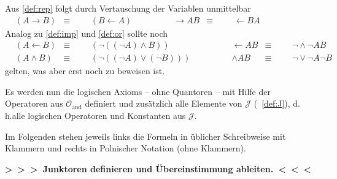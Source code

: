 \documentclass[english,ngerman,parskip=half,headsepline,footsepline,
	fleqn,notitlepage]{scrreprt}
\makeatletter
\newcommand*{\lrep}{\leftarrow}%
\newcommand*{\limp}{\rightarrow}%
\newcommand*{\asJ}{\mathcal{J}}%
\newcommand*{\asO}{\mathcal{O}}%
\newcommand*{\asOand}{\asO_\mathrm{and}}
\newcommand*{\formulatoleft}{&&&&&&&&&&}%
\newcommand*{\formulaspace}{&&&&}%
\newcommand*{\todo}[1]{\textbf{>~>~>~#1~<~<~<}}%
\newcommand*{\subsubsectionname}{Paragraph}
\newcommand*{\textdh}{d.\@\,h.\@ }
\newcommand*{\glsIdxPl}[1]{\glspl{#1}\idx{\gls{#1}}}%
\makeatother
\begin{document}
	Aus \ref{def:rep} folgt durch Vertauschung der Variablen unmittelbar
	\begin{align}
		&                 (A \limp B) & \equiv & & & (B \lrep A)
		& \formulaspace &   \limp A B & \equiv & & & \lrep B A
		\label{eq:imp}   \formulatoleft
	\end{align}
	Analog zu \ref{def:imp} und \ref{def:or} sollte noch
	\begin{align}
		&                 (A \lrep B) & \equiv & & & (\lnot ((\lnot A) \land B))
		& \formulaspace &   \lrep A B & \equiv & & & \lnot \land \lnot A B
		\label{eq:ref}   \\
		&             (A \land B) & \equiv & & & (\lnot((\lnot A)\lor(\lnot B)))
		& \formulaspace &   \land A B & \equiv & & & \lnot \lor \lnot A \lnot B
		\label{eq:and}    \formulatoleft
	\end{align}
	gelten, was aber erst noch zu beweisen ist.

	Es werden nun die logischen \glsIdxPl{Axiom}
	-- ohne Quantoren --
	mit Hilfe der Operatoren aus $\asOand$ definiert
	und zusätzlich alle Elemente von $\asJ$ (\seename~\vref{def:J}),
	\textdh alle logischen Operatoren und Konstanten aus $\asJ$.

	Im Folgenden stehen jeweils
	links die Formeln in üblicher Schreibweise mit Klammern
	und rechts in Polnischer Notation (ohne Klammern).

\todo{Junktoren definieren und Übereinstimmung ableiten.}%
\end{document}
